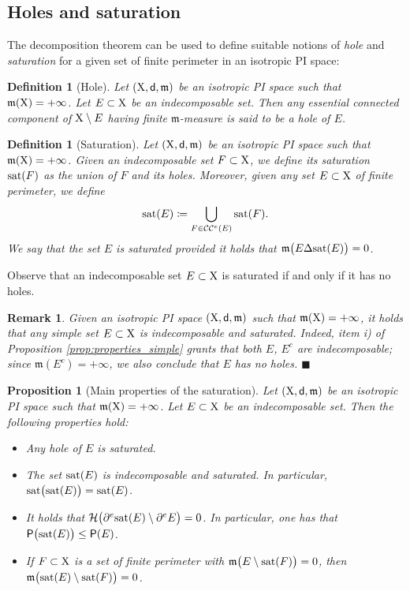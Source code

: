 \documentclass[reqno]{amsart}
\numberwithin{equation}{section}
\newcommand{\X}{{\rm X}}
\newcommand{\sfd}{{\sf d}}
\newcommand{\mm}{\mathfrak m}
\newcommand{\1}{\mathbbm 1}
\renewcommand{\P}{{\sf P}}
\renewcommand{\H}{{\mathcal H}}
\newcommand{\CC}{\mathcal{CC}^e}
\newcommand{\sat}{{\rm sat}}
\newcommand{\fr}{\penalty-20\null\hfill\(\blacksquare\)}
\newtheorem{proposition}[theorem]{Proposition}
\newtheorem{definition}[theorem]{Definition}
\newtheorem{remark}[theorem]{Remark}
\begin{document}
\subsection{Holes and saturation}\label{ss:holes_and_saturation}
%
%
The decomposition theorem can be used to define suitable notions
of \emph{hole} and \emph{saturation} for a given set of finite
perimeter in an isotropic PI space:
%
%
\begin{definition}[Hole]
Let \((\X,\sfd,\mm)\) be an isotropic PI space such that \(\mm(\X)=+\infty\).
Let \(E\subset\X\) be an indecomposable set. Then any essential connected component
of \(\X\setminus E\) having finite \(\mm\)-measure is said to be a \emph{hole} of \(E\).
\end{definition}
%
%
\begin{definition}[Saturation]
Let \((\X,\sfd,\mm)\) be an isotropic PI space such that \(\mm(\X)=+\infty\).
Given an indecomposable set \(F\subset\X\), we define its \emph{saturation} \(\sat(F)\)
as the union of \(F\) and its holes. Moreover, given any set \(E\subset\X\) of finite
perimeter, we define
\[
\sat(E)\coloneqq\bigcup_{F\in\CC(E)}\sat(F).
\]
We say that the set \(E\) is \emph{saturated} provided
it holds that \(\mm\big(E\Delta\sat(E)\big)=0\).
\end{definition}
%
%
Observe that an indecomposable set \(E\subset\X\) is saturated if and only
if it has no holes.
%
%
\begin{remark}\label{rmk:simple_sets_sat}{\rm
Given an isotropic PI space \((\X,\sfd,\mm)\) such that \(\mm(\X)=+\infty\),
it holds that any simple set \(E\subset\X\) is indecomposable and saturated.
Indeed, item i) of Proposition \ref{prop:properties_simple} grants that
both \(E\), \(E^c\) are indecomposable; since \(\mm(E^c)=+\infty\), we also
conclude that \(E\) has no holes.
\fr}\end{remark}
%
%
\begin{proposition}[Main properties of the saturation]\label{prop:properties_sat}
Let \((\X,\sfd,\mm)\) be an isotropic PI space such that \(\mm(\X)=+\infty\).
Let \(E\subset\X\) be an indecomposable set. Then the following properties hold:
\begin{itemize}
\item[\(\rm i)\)] Any hole of \(E\) is saturated.
\item[\(\rm ii)\)] The set \(\sat(E)\) is indecomposable and saturated.
In particular, \(\sat\big(\sat(E)\big)=\sat(E)\).
\item[\(\rm iii)\)] It holds that \(\H\big(\partial^e\sat(E)\setminus\partial^e E\big)=0\). 
In particular, one has that \(\P\big(\sat(E)\big)\leq\P(E)\).
\item[\(\rm iv)\)] If \(F\subset\X\) is a set of finite perimeter
with \(\mm\big(E\setminus\sat(F)\big)=0\), then
\(\mm\big(\sat(E)\setminus\sat(F)\big)=0\).
\end{itemize}
\end{proposition}
\end{document}
